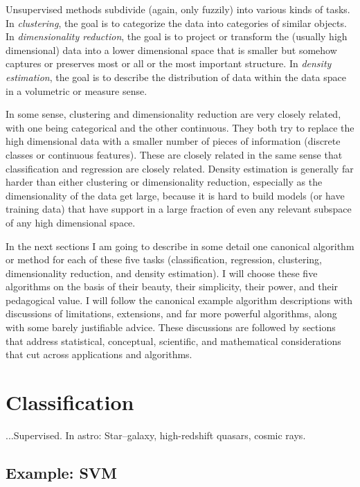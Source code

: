 \documentclass[12pt, twoside, letterpaper]{article}
\begin{document}
Unsupervised methods subdivide (again, only fuzzily) into various
kinds of tasks.
In \emph{clustering}, the goal is to categorize the data into categories
of similar objects.
In \emph{dimensionality reduction}, the goal is to project or
transform the (usually high dimensional) data into a lower dimensional
space that is smaller but somehow captures or preserves most or all or
the most important structure.
In \emph{density estimation}, the goal is to describe the distribution
of data within the data space in a volumetric or measure sense.

In some sense, clustering and dimensionality reduction are very closely
related, with one being categorical and the other continuous.
They both try to replace the high dimensional data with a smaller number of
pieces of information (discrete classes or continuous features).
These are closely related in the
same sense that classification and regression are closely related.
Density estimation is generally far harder than either clustering
or dimensionality reduction, especially as the dimensionality of the
data get large, because it is hard to build models (or have training
data) that have support in a large fraction of even any relevant
subspace of any high dimensional space.

In the next sections I am going to describe in some detail one
canonical algorithm or method for each of these five tasks
(classification, regression, clustering, dimensionality reduction,
and density estimation).
I will choose these five algorithms on the basis of their beauty, their
simplicity, their power, and their pedagogical value.
I will follow the canonical example algorithm descriptions with discussions
of limitations, extensions, and far more powerful algorithms, along
with some barely justifiable advice.
These discussions are followed by sections that address statistical,
conceptual, scientific, and mathematical considerations that cut
across applications and algorithms.

\section{Classification}

...Supervised. In astro: Star--galaxy, high-redshift quasars, cosmic rays.

\subsection{Example: SVM}
\end{document}
